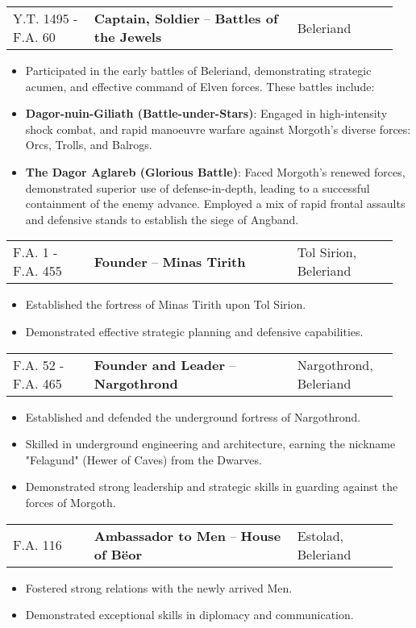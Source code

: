 \documentclass[a4paper, 10pt]{article}
\makeatletter
\newcommand{\entry}[4]{
    \vspace{6pt}
    \footnotesize
    \noindent
    \begin{tabular}{@{} p{0.2\linewidth} p{0.5\linewidth} p{0.25\linewidth} @{}}
        {#4} & \textbf{#1} -- \textbf{#2} & \hfill{#3} \\
    \end{tabular}
    \vspace{4pt}
}
\makeatother
\begin{document}
\entry{Captain, Soldier}{Battles of the Jewels}{Beleriand}{Y.T. 1495 - F.A. 60}
\begin{itemize}[left=0.25\linewidth, noitemsep, before=\small]
\footnotesize
    \footnotesize
    \item Participated in the early battles of Beleriand, demonstrating strategic acumen, and effective command of Elven forces. These battles include:
    \item \textbf{Dagor-nuin-Giliath (Battle-under-Stars)}: Engaged in high-intensity shock combat, and rapid manoeuvre warfare against Morgoth's diverse forces: Orcs, Trolls, and Balrogs.
    \item \textbf{The Dagor Aglareb (Glorious Battle)}: Faced Morgoth's renewed forces, demonstrated superior use of defense-in-depth, leading to a successful containment of the enemy advance. Employed a mix of rapid frontal assaults and defensive stands to establish the siege of Angband.
\end{itemize}

\entry{Founder}{Minas Tirith}{Tol Sirion, Beleriand}{F.A. 1 - F.A. 455}
\begin{itemize}[left=0.25\linewidth, noitemsep, before=\small]
    \footnotesize
    \item Established the fortress of Minas Tirith upon Tol Sirion.
    \item Demonstrated effective strategic planning and defensive capabilities.
\end{itemize}


\entry{Founder and Leader}{Nargothrond}{Nargothrond, Beleriand}{F.A. 52 - F.A. 465}
\begin{itemize}[left=0.25\linewidth, noitemsep, before=\small]
    \footnotesize
    \item Established and defended the underground fortress of Nargothrond.
    \item Skilled in underground engineering and architecture, earning the nickname "Felagund" (Hewer of Caves) from the Dwarves.
    \item Demonstrated strong leadership and strategic skills in guarding against the forces of Morgoth.
\end{itemize}

\entry{Ambassador to Men}{House of Bëor}{Estolad, Beleriand}{F.A. 116}
\begin{itemize}[left=0.25\linewidth, noitemsep, before=\small]
    \footnotesize
    \item Fostered strong relations with the newly arrived Men.
    \item Demonstrated exceptional skills in diplomacy and communication.
\end{itemize}
\end{document}
